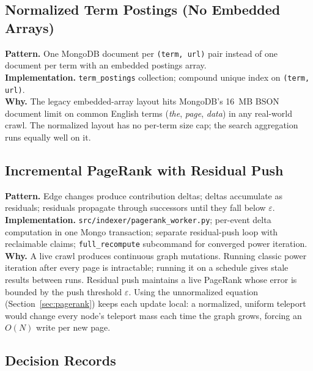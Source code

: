 \documentclass[11pt,a4paper]{article}
\newcommand{\code}[1]{\texttt{#1}}
\begin{document}
\subsection{Normalized Term Postings (No Embedded Arrays)}

\textbf{Pattern.} One MongoDB document per \code{(term, url)} pair instead of one document per term with an embedded postings array.\\
\textbf{Implementation.} \code{term\_postings} collection; compound unique index on \code{(term, url)}.\\
\textbf{Why.} The legacy embedded-array layout hits MongoDB's 16~MB BSON document limit on common English terms (\textit{the}, \textit{page}, \textit{data}) in any real-world crawl. The normalized layout has no per-term size cap; the search aggregation runs equally well on it.

\subsection{Incremental PageRank with Residual Push}

\textbf{Pattern.} Edge changes produce contribution deltas; deltas accumulate as residuals; residuals propagate through successors until they fall below $\varepsilon$.\\
\textbf{Implementation.} \code{src/indexer/pagerank\_worker.py}; per-event delta computation in one Mongo transaction; separate residual-push loop with reclaimable claims; \code{full\_recompute} subcommand for converged power iteration.\\
\textbf{Why.} A live crawl produces continuous graph mutations. Running classic power iteration after every page is intractable; running it on a schedule gives stale results between runs. Residual push maintains a live PageRank whose error is bounded by the push threshold $\varepsilon$. Using the unnormalized equation (Section~\ref{sec:pagerank}) keeps each update local: a normalized, uniform teleport would change every node's teleport mass each time the graph grows, forcing an $O(N)$ write per new page.

\subsection{Decision Records}
\end{document}
